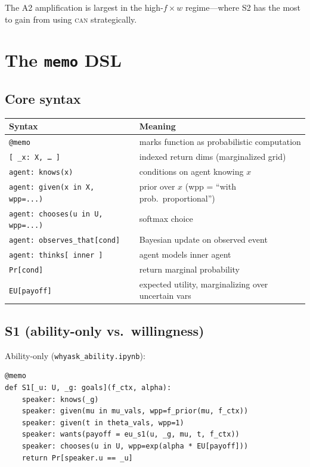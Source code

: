 \documentclass[11pt]{article}
\begin{document}
The A2 amplification is largest in the high-$f \times w$ regime---where S2 has
the most to gain from using \textsc{can} strategically.

\section{The \texttt{memo} DSL}

\subsection{Core syntax}

\begin{center}
\renewcommand{\arraystretch}{1.4}
\begin{tabular}{ll}
\toprule
\textbf{Syntax} & \textbf{Meaning} \\
\midrule
\texttt{@memo} & marks function as probabilistic computation \\
\texttt{[\,\_x: X,\,\ldots\,]} & indexed return dims (marginalized grid) \\
\texttt{agent: knows(x)} & conditions on agent knowing $x$ \\
\texttt{agent: given(x in X, wpp=...)} & prior over $x$ (wpp = ``with prob.\ proportional'') \\
\texttt{agent: chooses(u in U, wpp=...)} & softmax choice \\
\texttt{agent: observes\_that[cond]} & Bayesian update on observed event \\
\texttt{agent: thinks[\,inner\,]} & agent models inner agent \\
\texttt{Pr[cond]} & return marginal probability \\
\texttt{EU[payoff]} & expected utility, marginalizing over uncertain vars \\
\bottomrule
\end{tabular}
\end{center}

\subsection{S1 (ability-only vs.\ willingness)}

Ability-only (\texttt{whyask\_ability.ipynb}):
\begin{verbatim}
@memo
def S1[_u: U, _g: goals](f_ctx, alpha):
    speaker: knows(_g)
    speaker: given(mu in mu_vals, wpp=f_prior(mu, f_ctx))
    speaker: given(t in theta_vals, wpp=1)
    speaker: wants(payoff = eu_s1(u, _g, mu, t, f_ctx))
    speaker: chooses(u in U, wpp=exp(alpha * EU[payoff]))
    return Pr[speaker.u == _u]
\end{verbatim}
\end{document}
